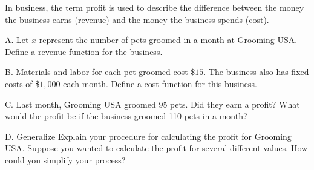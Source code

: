 \documentclass{article}
\newenvironment{model-discuss}{}{}      %
\newcommand{\answer}[1]{}               %
\newcommand{\placeholder}[2]{}          %
\begin{document}
\begin{model-discuss}
In business, the term profit is used to describe the difference between the money the business earns (revenue) and the money the business spends (cost).

\placeholder{photo}{Groomer with a dog and a sign reading ``GROOMING \$25 per pet.''}

A. Let \(x\) represent the number of pets groomed in a month at Grooming USA. Define a revenue function for the business.

B. Materials and labor for each pet groomed cost \(\$15\). The business also has fixed costs of \(\$1{,}000\) each month. Define a cost function for this business.

C. Last month, Grooming USA groomed 95 pets. Did they earn a profit? What would the profit be if the business groomed 110 pets in a month?

D. Generalize Explain your procedure for calculating the profit for Grooming USA. Suppose you wanted to calculate the profit for several different values. How could you simplify your process?

\answer{A. \(r(x)=25x\). B. \(c(x)=15x+1000\). C. No; grooming only 95 pets results in a loss of \(\$50\) for Grooming USA. Grooming 110 pets results in a profit of \(\$100\). D. To find the profit from 95 pets, I calculated \(r(95)-c(95)\); to find the profit from 110 pets, I calculated \(r(110)-c(110)\). If I needed to find the profit for several different values, it would make sense to find a function rule for profit and apply that simplified rule rather than applying two different functions and finding the difference of their values.}
\end{model-discuss}
\end{document}
